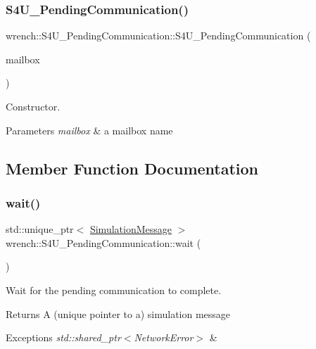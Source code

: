 \subsubsection{\texorpdfstring{S4\+U\+\_\+\+Pending\+Communication()}{S4U\_PendingCommunication()}}
{\footnotesize\ttfamily wrench\+::\+S4\+U\+\_\+\+Pending\+Communication\+::\+S4\+U\+\_\+\+Pending\+Communication (\begin{DoxyParamCaption}\item[{std\+::string}]{mailbox }\end{DoxyParamCaption})}



Constructor. 


\begin{DoxyParams}{Parameters}
{\em mailbox} & a mailbox name \\
\hline
\end{DoxyParams}


\subsection{Member Function Documentation}
\mbox{\label{classwrench_1_1_s4_u___pending_communication_ae50dec7ef82e3a95eb2961591b40c583}} 
\subsubsection{\texorpdfstring{wait()}{wait()}}
{\footnotesize\ttfamily std\+::unique\+\_\+ptr$<$ \hyperlink{classwrench_1_1_simulation_message}{Simulation\+Message} $>$ wrench\+::\+S4\+U\+\_\+\+Pending\+Communication\+::wait (\begin{DoxyParamCaption}{ }\end{DoxyParamCaption})}



Wait for the pending communication to complete. 

\begin{DoxyReturn}{Returns}
A (unique pointer to a) simulation message
\end{DoxyReturn}

\begin{DoxyExceptions}{Exceptions}
{\em std\+::shared\+\_\+ptr$<$\+Network\+Error$>$} & \\
\hline
\end{DoxyExceptions}
\mbox{\label{classwrench_1_1_s4_u___pending_communication_a161f81593a2998e5811eed28dea1efc0}} 

